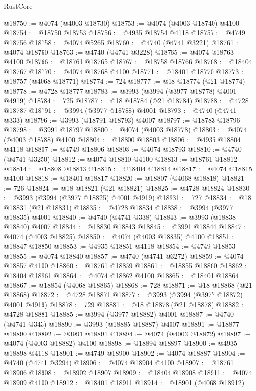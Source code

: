 \begin{lexlean}{RustCore}
\begin{coremodule}
@18750 := @4074 (@4003 @18730)
@18753 := @4074 (@4003 @18740) @4100
@18754 := @18750 @18753
@18756 := @4935 @18754 @4118
@18757 := @4749 @18756
@18758 := @4074 @5265
@18760 := @4740 (@4741 @3221)
@18761 := @4074 @18760
@18763 := @4740 (@4741 @3228)
@18765 := @4074 @18763 @4100
@18766 := @18761 @18765
@18767 := @18758 @18766
@18768 := @18404 @18767
@18770 := @4074 @18768 @4100
@18771 := @18401 @18770
@18773 := @18757 (@4068 @18771)
@18774 := 724
@18777 := @18 @18774 (@21 @18774)
@18778 := @4728 @18777
@18783 := @3993 (@3994 (@3977 @18778) @4001 @4919)
@18784 := 725
@18787 := @18 @18784 (@21 @18784)
@18788 := @4728 @18787
@18791 := @3994 (@3977 @18788) @4001
@18793 := @4740 (@4741 @333)
@18796 := @3993 (@18791 @18793) @4007
@18797 := @18783 @18796
@18798 := @3991 @18797
@18800 := @4074 (@4003 @18778)
@18803 := @4074 (@4003 @18788) @4100
@18804 := @18800 @18803
@18806 := @4935 @18804 @4118
@18807 := @4749 @18806
@18808 := @4074 @18793
@18810 := @4740 (@4741 @3250)
@18812 := @4074 @18810 @4100
@18813 := @18761 @18812
@18814 := @18808 @18813
@18815 := @18404 @18814
@18817 := @4074 @18815 @4100
@18818 := @18401 @18817
@18820 := @18807 (@4068 @18818)
@18821 := 726
@18824 := @18 @18821 (@21 @18821)
@18825 := @4728 @18824
@18830 := @3993 (@3994 (@3977 @18825) @4001 @4919)
@18831 := 727
@18834 := @18 @18831 (@21 @18831)
@18835 := @4728 @18834
@18838 := @3994 (@3977 @18835) @4001
@18840 := @4740 (@4741 @338)
@18843 := @3993 (@18838 @18840) @4007
@18844 := @18830 @18843
@18845 := @3991 @18844
@18847 := @4074 (@4003 @18825)
@18850 := @4074 (@4003 @18835) @4100
@18851 := @18847 @18850
@18853 := @4935 @18851 @4118
@18854 := @4749 @18853
@18855 := @4074 @18840
@18857 := @4740 (@4741 @3272)
@18859 := @4074 @18857 @4100
@18860 := @18761 @18859
@18861 := @18855 @18860
@18862 := @18404 @18861
@18864 := @4074 @18862 @4100
@18865 := @18401 @18864
@18867 := @18854 (@4068 @18865)
@18868 := 728
@18871 := @18 @18868 (@21 @18868)
@18872 := @4728 @18871
@18877 := @3993 (@3994 (@3977 @18872) @4001 @4919)
@18878 := 729
@18881 := @18 @18878 (@21 @18878)
@18882 := @4728 @18881
@18885 := @3994 (@3977 @18882) @4001
@18887 := @4740 (@4741 @343)
@18890 := @3993 (@18885 @18887) @4007
@18891 := @18877 @18890
@18892 := @3991 @18891
@18894 := @4074 (@4003 @18872)
@18897 := @4074 (@4003 @18882) @4100
@18898 := @18894 @18897
@18900 := @4935 @18898 @4118
@18901 := @4749 @18900
@18902 := @4074 @18887
@18904 := @4740 (@4741 @3294)
@18906 := @4074 @18904 @4100
@18907 := @18761 @18906
@18908 := @18902 @18907
@18909 := @18404 @18908
@18911 := @4074 @18909 @4100
@18912 := @18401 @18911
@18914 := @18901 (@4068 @18912)

\end{coremodule}
\end{lexlean}
